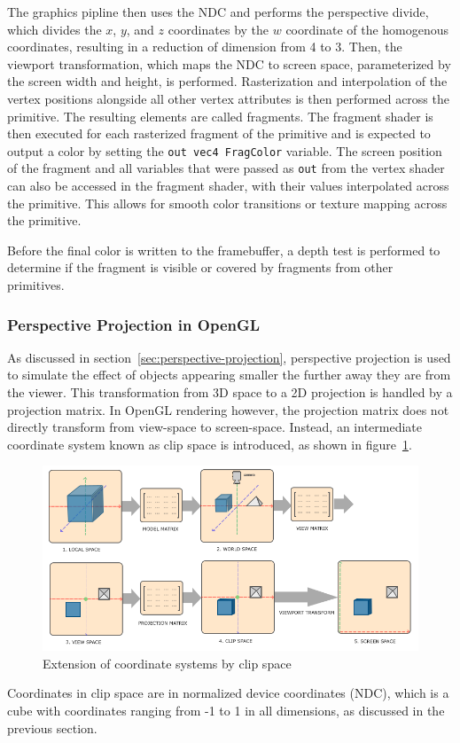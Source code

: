 The graphics pipline then uses the NDC and performs the perspective divide,
which divides the $x$, $y$, and $z$ coordinates by the $w$ coordinate of the homogenous coordinates,
resulting in a reduction of dimension from 4 to 3.
Then, the viewport transformation, which maps the NDC to screen space,
parameterized by the screen width and height, is performed.
Rasterization and interpolation of the vertex positions alongside all other vertex attributes
is then performed across the primitive.
The resulting elements are called fragments.
The fragment shader is then executed for each rasterized fragment of the primitive and is expected to
output a color by setting the \texttt{out vec4 FragColor} variable.
The screen position of the fragment and all variables that were passed as \texttt{out} from the
vertex shader can also be accessed in the fragment shader, with their values interpolated across the primitive.
This allows for smooth color transitions or texture mapping across the primitive.

Before the final color is written to the framebuffer,
a depth test is performed to determine if the fragment is visible or covered by fragments from other primitives.


\subsubsection{Perspective Projection in OpenGL}

As discussed in section~\ref{sec:perspective-projection}, perspective projection is used
to simulate the effect of objects appearing smaller the further away they are from the viewer.
This transformation from 3D space to a 2D projection is handled by a projection matrix.
In OpenGL rendering however, the projection matrix does not directly transform from view-space to screen-space.
Instead, an intermediate coordinate system known as clip space is introduced, as shown in figure~\ref{fig:coordinate-systems-with-clip-space}.
\begin{figure}[h!]
    \centering
    \includegraphics[width=0.85\linewidth]{images/coordinate_systems}
    \caption{Extension of coordinate systems by clip space}
    \label{fig:coordinate-systems-with-clip-space}
\end{figure}
Coordinates in clip space are in normalized device coordinates (NDC), which is a cube
with coordinates ranging from -1 to 1 in all dimensions, as discussed in the previous section.

